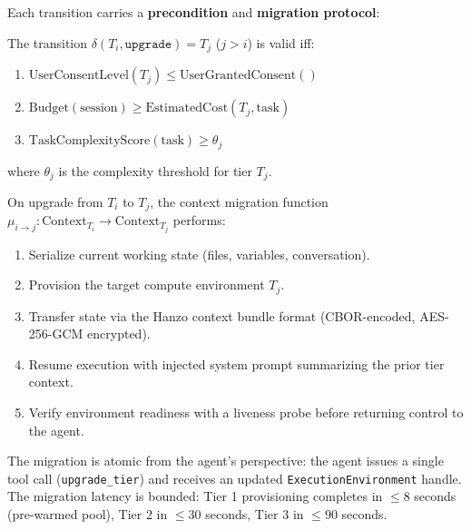 Each transition carries a \textbf{precondition} and \textbf{migration protocol}:

\begin{definition}
The transition $\delta(T_i, \texttt{upgrade}) = T_j$ ($j > i$) is valid iff:
\begin{enumerate}[leftmargin=1.5em, label=(\roman*)]
    \item $\text{UserConsentLevel}(T_j) \leq \text{UserGrantedConsent}()$
    \item $\text{Budget}(\text{session}) \geq \text{EstimatedCost}(T_j, \text{task})$
    \item $\text{TaskComplexityScore}(\text{task}) \geq \theta_j$
\end{enumerate}
where $\theta_j$ is the complexity threshold for tier $T_j$.
\end{definition}

\begin{definition}
On upgrade from $T_i$ to $T_j$, the context migration function
$\mu_{i \to j} : \text{Context}_{T_i} \to \text{Context}_{T_j}$ performs:
\begin{enumerate}[leftmargin=1.5em, label=(\roman*)]
    \item Serialize current working state (files, variables, conversation).
    \item Provision the target compute environment $T_j$.
    \item Transfer state via the Hanzo context bundle format (CBOR-encoded,
          AES-256-GCM encrypted).
    \item Resume execution with injected system prompt summarizing the prior
          tier context.
    \item Verify environment readiness with a liveness probe before returning
          control to the agent.
\end{enumerate}
\end{definition}

The migration is atomic from the agent's perspective: the agent issues a
single tool call (\texttt{upgrade\_tier}) and receives an updated
\texttt{ExecutionEnvironment} handle. The migration latency is bounded:
Tier 1 provisioning completes in $\leq 8$ seconds (pre-warmed pool),
Tier 2 in $\leq 30$ seconds, Tier 3 in $\leq 90$ seconds.

